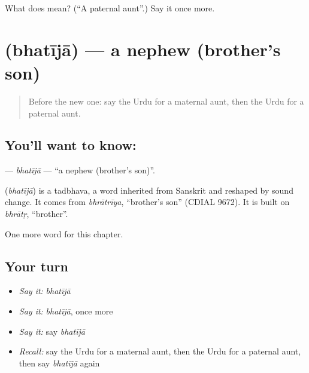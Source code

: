 \begin{tcolorbox}[breakable,colback=teal!4,colframe=teal!35!black,title={Before you move on}]
What does  mean? (\textquotedblleft{}A paternal aunt\textquotedblright{}.) Say it once more.
\end{tcolorbox}
\section[\texorpdfstring{\ur{بھتیجا} (bhatījā)}{بھتیجا (bhatījā)}]{ (bhatījā) — a nephew (brother's son)}

\label{lesson:UR-C203-bhatija}



\begin{quote}
Before the new one: say the Urdu for a maternal aunt, then the Urdu for a paternal aunt.
\end{quote}

\subsection*{You'll want to know: }
\textbf{} — \emph{bhatījā} — \textquotedblleft{}a nephew (brother's son)\textquotedblright{}.

\begin{cousinweb}
\textbf{} (\emph{bhatījā}) is a tadbhava, a word inherited from Sanskrit and reshaped by sound change. It comes from \emph{bhrātrīya}, \textquotedblleft{}brother's son\textquotedblright{} (CDIAL 9672). It is built on \emph{bhrātṛ}, \textquotedblleft{}brother\textquotedblright{}.
\end{cousinweb}

\begin{grammarlens}[title={What you've built}]
One more word for this chapter.
\end{grammarlens}

\subsection*{Your turn}
\begin{itemize}
\raggedright
  \item \emph{Say it:} \emph{bhatījā}
  \item \emph{Say it:} \emph{bhatījā}, once more
  \item \emph{Say it:} say \emph{bhatījā}
  \item \emph{Recall:} say the Urdu for a maternal aunt, then the Urdu for a paternal aunt, then say \emph{bhatījā} again
\end{itemize}

